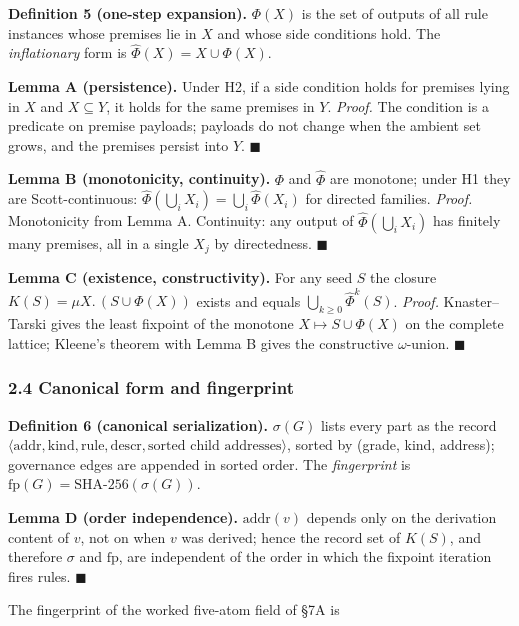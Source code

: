 \documentclass[
  10pt,
]{article}
\begin{document}
\textbf{Definition 5 (one-step expansion).} \(\Phi(X)\) is the set of
outputs of all rule instances whose premises lie in \(X\) and whose side
conditions hold. The \emph{inflationary} form is
\(\hat\Phi(X) = X \cup \Phi(X)\).

\textbf{Lemma A (persistence).} Under H2, if a side condition holds for
premises lying in \(X\) and \(X \subseteq Y\), it holds for the same
premises in \(Y\). \emph{Proof.} The condition is a predicate on premise
payloads; payloads do not change when the ambient set grows, and the
premises persist into \(Y\). \(\blacksquare\)

\textbf{Lemma B (monotonicity, continuity).} \(\Phi\) and \(\hat\Phi\)
are monotone; under H1 they are Scott-continuous:
\(\hat\Phi(\bigcup_i X_i) = \bigcup_i \hat\Phi(X_i)\) for directed
families. \emph{Proof.} Monotonicity from Lemma A. Continuity: any
output of \(\hat\Phi(\bigcup_i X_i)\) has finitely many premises, all in
a single \(X_j\) by directedness. \(\blacksquare\)

\textbf{Lemma C (existence, constructivity).} For any seed \(S\) the
closure \(K(S) = \mu X.\,(S \cup \Phi(X))\) exists and equals
\(\bigcup_{k \ge 0} \hat\Phi^k(S)\). \emph{Proof.} Knaster--Tarski gives
the least fixpoint of the monotone \(X \mapsto S \cup \Phi(X)\) on the
complete lattice; Kleene's theorem with Lemma B gives the constructive
\(\omega\)-union. \(\blacksquare\)

\hypertarget{canonical-form-and-fingerprint}{%
\subsubsection{2.4 Canonical form and
fingerprint}\label{canonical-form-and-fingerprint}}

\textbf{Definition 6 (canonical serialization).} \(\sigma(G)\) lists
every part as the record
\(\langle \mathrm{addr}, \mathrm{kind}, \mathrm{rule}, \mathrm{descr}, \text{sorted child addresses} \rangle\),
sorted by (grade, kind, address); governance edges are appended in
sorted order. The \emph{fingerprint} is
\(\mathrm{fp}(G) = \mathrm{SHA\text{-}256}(\sigma(G))\).

\textbf{Lemma D (order independence).} \(\mathrm{addr}(v)\) depends only
on the derivation content of \(v\), not on when \(v\) was derived; hence
the record set of \(K(S)\), and therefore \(\sigma\) and
\(\mathrm{fp}\), are independent of the order in which the fixpoint
iteration fires rules. \(\blacksquare\)

The fingerprint of the worked five-atom field of §7A is
\end{document}
